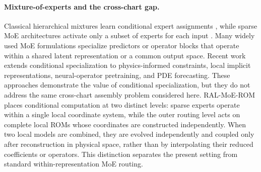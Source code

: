\paragraph{Mixture-of-experts and the cross-chart gap.}
Classical hierarchical mixtures learn conditional expert assignments \citep{jacobs1991,jordan1994}, while sparse MoE architectures activate only a subset of experts for each input \citep{shazeer2017,fedus2022}. Many widely used MoE formulations specialize predictors or operator blocks that operate within a shared latent representation or a common output space. Recent work extends conditional specialization to physics-informed constraints, local implicit representations, neural-operator pretraining, and PDE forecasting\citep{ICLR2024_9aeda582,NEURIPS2024_b83fae17,NEURIPS2025_2d23a999,ICLR2026_754612bd}. These approaches demonstrate the value of conditional specialization, but they do not address the same cross-chart assembly problem considered here. RAL-MoE-ROM places conditional computation at two distinct levels: sparse experts operate within a single local coordinate system, while the outer routing level acts on complete local ROMs whose coordinates are constructed independently. When two local models are combined, they are evolved independently and
coupled only after reconstruction in physical space, rather than by interpolating their reduced coefficients or operators. This distinction separates the present setting from standard within-representation MoE routing.
